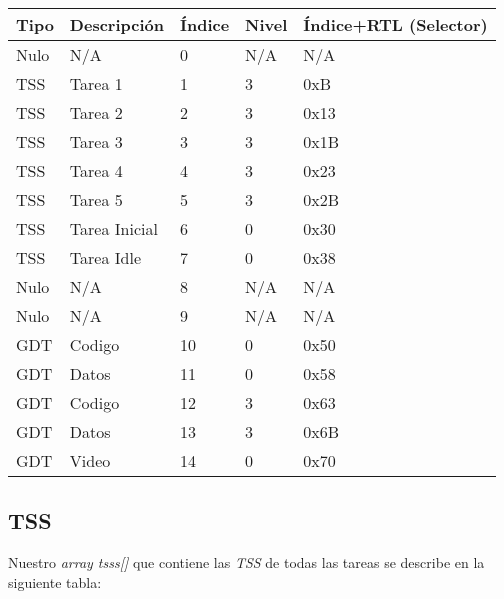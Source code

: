 \begin{tabular}{|l|l|l|l|l|}
	\hline
	Tipo & Descripción  & Índice & Nivel& Índice+RTL (Selector) \\ \hline
	Nulo & N/A          & 0      & N/A  & N/A  \\ \hline
	TSS  & Tarea 1      & 1      & 3    & 0xB  \\ \hline
	TSS  & Tarea 2      & 2      & 3    & 0x13 \\ \hline
	TSS  & Tarea 3      & 3      & 3    & 0x1B \\ \hline
	TSS  & Tarea 4      & 4      & 3    & 0x23 \\ \hline
	TSS  & Tarea 5      & 5      & 3    & 0x2B \\ \hline
	TSS  & Tarea Inicial& 6      & 0    & 0x30 \\ \hline
	TSS  & Tarea Idle   & 7      & 0    & 0x38 \\ \hline
	Nulo & N/A          & 8      & N/A  & N/A\\ \hline
	Nulo & N/A          & 9      & N/A  & N/A\\ \hline
	GDT  & Codigo       & 10     & 0    & 0x50 \\ \hline
	GDT  & Datos        & 11     & 0    & 0x58 \\ \hline
	GDT  & Codigo       & 12     & 3    & 0x63 \\ \hline
	GDT  & Datos        & 13     & 3    & 0x6B \\ \hline
	GDT  & Video        & 14     & 0    & 0x70 \\ \hline
\end{tabular}

\subsection{TSS}
Nuestro \textit{array tsss[]} que contiene las \textit{TSS} de todas las tareas se describe en la siguiente tabla:\\

